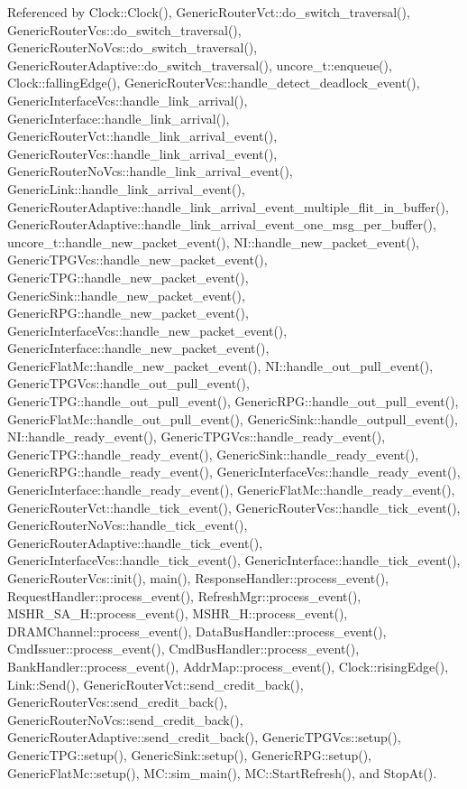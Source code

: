 Referenced by Clock::Clock(), GenericRouterVct::do\_\-switch\_\-traversal(), GenericRouterVcs::do\_\-switch\_\-traversal(), GenericRouterNoVcs::do\_\-switch\_\-traversal(), GenericRouterAdaptive::do\_\-switch\_\-traversal(), uncore\_\-t::enqueue(), Clock::fallingEdge(), GenericRouterVcs::handle\_\-detect\_\-deadlock\_\-event(), GenericInterfaceVcs::handle\_\-link\_\-arrival(), GenericInterface::handle\_\-link\_\-arrival(), GenericRouterVct::handle\_\-link\_\-arrival\_\-event(), GenericRouterVcs::handle\_\-link\_\-arrival\_\-event(), GenericRouterNoVcs::handle\_\-link\_\-arrival\_\-event(), GenericLink::handle\_\-link\_\-arrival\_\-event(), GenericRouterAdaptive::handle\_\-link\_\-arrival\_\-event\_\-multiple\_\-flit\_\-in\_\-buffer(), GenericRouterAdaptive::handle\_\-link\_\-arrival\_\-event\_\-one\_\-msg\_\-per\_\-buffer(), uncore\_\-t::handle\_\-new\_\-packet\_\-event(), NI::handle\_\-new\_\-packet\_\-event(), GenericTPGVcs::handle\_\-new\_\-packet\_\-event(), GenericTPG::handle\_\-new\_\-packet\_\-event(), GenericSink::handle\_\-new\_\-packet\_\-event(), GenericRPG::handle\_\-new\_\-packet\_\-event(), GenericInterfaceVcs::handle\_\-new\_\-packet\_\-event(), GenericInterface::handle\_\-new\_\-packet\_\-event(), GenericFlatMc::handle\_\-new\_\-packet\_\-event(), NI::handle\_\-out\_\-pull\_\-event(), GenericTPGVcs::handle\_\-out\_\-pull\_\-event(), GenericTPG::handle\_\-out\_\-pull\_\-event(), GenericRPG::handle\_\-out\_\-pull\_\-event(), GenericFlatMc::handle\_\-out\_\-pull\_\-event(), GenericSink::handle\_\-outpull\_\-event(), NI::handle\_\-ready\_\-event(), GenericTPGVcs::handle\_\-ready\_\-event(), GenericTPG::handle\_\-ready\_\-event(), GenericSink::handle\_\-ready\_\-event(), GenericRPG::handle\_\-ready\_\-event(), GenericInterfaceVcs::handle\_\-ready\_\-event(), GenericInterface::handle\_\-ready\_\-event(), GenericFlatMc::handle\_\-ready\_\-event(), GenericRouterVct::handle\_\-tick\_\-event(), GenericRouterVcs::handle\_\-tick\_\-event(), GenericRouterNoVcs::handle\_\-tick\_\-event(), GenericRouterAdaptive::handle\_\-tick\_\-event(), GenericInterfaceVcs::handle\_\-tick\_\-event(), GenericInterface::handle\_\-tick\_\-event(), GenericRouterVcs::init(), main(), ResponseHandler::process\_\-event(), RequestHandler::process\_\-event(), RefreshMgr::process\_\-event(), MSHR\_\-SA\_\-H::process\_\-event(), MSHR\_\-H::process\_\-event(), DRAMChannel::process\_\-event(), DataBusHandler::process\_\-event(), CmdIssuer::process\_\-event(), CmdBusHandler::process\_\-event(), BankHandler::process\_\-event(), AddrMap::process\_\-event(), Clock::risingEdge(), Link::Send(), GenericRouterVct::send\_\-credit\_\-back(), GenericRouterVcs::send\_\-credit\_\-back(), GenericRouterNoVcs::send\_\-credit\_\-back(), GenericRouterAdaptive::send\_\-credit\_\-back(), GenericTPGVcs::setup(), GenericTPG::setup(), GenericSink::setup(), GenericRPG::setup(), GenericFlatMc::setup(), MC::sim\_\-main(), MC::StartRefresh(), and StopAt().
